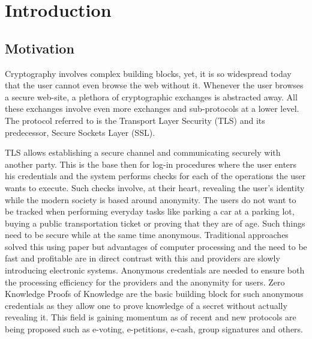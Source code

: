 \chapter{Introduction}

\section{Motivation}
\label{sec:thesis_motivation}

Cryptography involves complex building blocks, yet, it is so
widespread today that the user cannot even browse the web without
it. Whenever the user browses a secure web-site, a plethora of
cryptographic exchanges is abstracted away. All these exchanges
involve even more exchanges and sub-protocols at a lower level. The
protocol referred to is the Transport Layer Security (TLS) and its
predecessor, Secure Sockets Layer (SSL).

TLS allows establishing a secure channel and communicating securely
with another party. This is the base then for log-in procedures where
the user enters his credentials and the system performs checks for
each of the operations the user wants to execute. Such checks involve,
at their heart, revealing the user's identity while the modern society
is based around anonymity. The users do not want to be tracked when
performing everyday tasks like parking a car at a parking lot, buying
a public transportation ticket or proving that they are of age. Such
things need to be secure while at the same time anonymous. Traditional
approaches solved this using paper but advantages of computer
processing and the need to be fast and profitable are in direct
contrast with this and providers are slowly introducing electronic
systems. Anonymous credentials are needed to ensure both the
processing efficiency for the providers and the anonymity for
users. Zero Knowledge Proofs of Knowledge are the basic building block
for such anonymous credentials as they allow one to prove knowledge of
a secret without actually revealing it. This field is gaining momentum
as of recent and new protocols are being proposed such as e-voting,
e-petitions, e-cash, group signatures and others.

